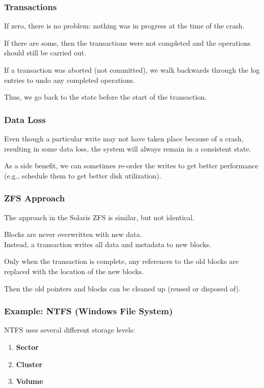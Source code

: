 \begin{frame}
\frametitle{Transactions}

If zero, there is no problem: nothing was in progress at the time of the crash. 

If there are some, then the transactions were not completed and the operations should still be carried out. 

If a transaction was aborted (not committed), we walk backwards through the log entries to undo any completed operations.

Thus, we go back to the state before the start of the transaction.




\end{frame}

\begin{frame}
\frametitle{Data Loss}

Even though a particular write may not have taken place because of a crash, resulting in some data loss, the system will always remain in a consistent state. 

As a side benefit, we can sometimes re-order the writes to get better performance (e.g., schedule them to get better disk utilization). 


\end{frame}

\begin{frame}
\frametitle{ZFS Approach}

The approach in the Solaris ZFS is similar, but not identical. 

Blocks are never overwritten with new data.\\
\quad Instead, a transaction writes all data and metadata to new blocks. 

Only when the transaction is complete, any references to the old blocks are replaced with the location of the new blocks. 


Then the old pointers and blocks can be cleaned up (reused or disposed of). 


\end{frame}



\begin{frame}
\frametitle{Example: NTFS (Windows File System)}

NTFS uses several different storage levels:

\begin{enumerate}
	\item \textbf{Sector}
	\item \textbf{Cluster}
	\item \textbf{Volume}
\end{enumerate}


\end{frame}

